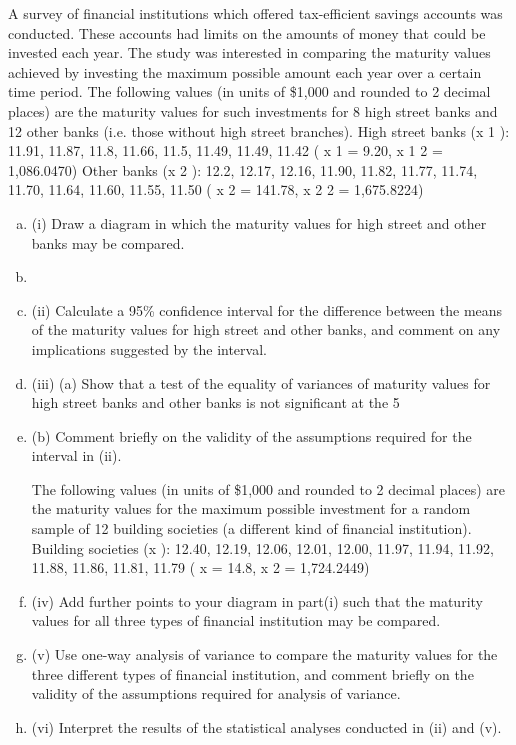 \documentclass[a4paper,12pt]{article}
\begin{document}
\begin{enumerate}


A survey of financial institutions which offered tax-efficient savings accounts was conducted. These accounts had limits on the amounts of money that could be invested each year. The study was interested in comparing the maturity values achieved by investing the maximum possible amount each year over a certain time period.
The following values (in units of \$1,000 and rounded to 2 decimal places) are the
maturity values for such investments for 8 high street banks and 12 other banks (i.e.
those without high street branches).
High street banks (x 1 ): 11.91, 11.87, 11.8, 11.66, 11.5, 11.49, 11.49, 11.42
( x 1 = 9.20, x 1 2 = 1,086.0470)
Other banks (x 2 ): 12.2, 12.17, 12.16, 11.90, 11.82, 11.77, 11.74, 11.70, 11.64, 11.60,
11.55, 11.50
( x 2 = 141.78, x 2 2 = 1,675.8224)
\begin{enumerate}[(a)]
 \item (i) Draw a diagram in which the maturity values for high street and other banks
may be compared.
\item 
\item (ii) Calculate a 95\% confidence interval for the difference between the means of the maturity values for high street and other banks, and comment on any
implications suggested by the interval.
\item (iii) (a)
Show that a test of the equality of variances of maturity values for high street banks and other banks is not significant at the 5%
\item (b)
Comment briefly on the validity of the assumptions required for the interval in (ii).

The following values (in units of \$1,000 and rounded to 2 decimal places) are the
maturity values for the maximum possible investment for a random sample of 12
building societies (a different kind of financial institution).
Building societies (x  ): 12.40, 12.19, 12.06, 12.01, 12.00, 11.97, 11.94, 11.92, 11.88,
11.86, 11.81, 11.79
( x  = 14.8, x  2 = 1,724.2449)
\item (iv) Add further points to your diagram in part(i) such that the maturity values for
all three types of financial institution may be compared.
\item (v) Use one-way analysis of variance to compare the maturity values for the three different types of financial institution, and comment briefly on the validity of
the assumptions required for analysis of variance.
\item (vi) Interpret the results of the statistical analyses conducted in (ii) and (v).
\end{enumerate}


\end{enumerate}
\end{document}
